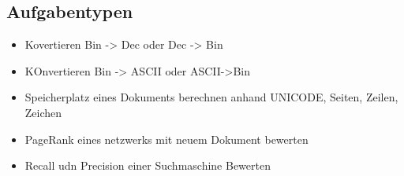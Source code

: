 \subsection{Aufgabentypen}
\begin{itemize}
    \item Kovertieren Bin -> Dec  oder Dec -> Bin
    \item KOnvertieren Bin -> ASCII oder ASCII->Bin
    \item Speicherplatz eines Dokuments berechnen anhand UNICODE, Seiten, Zeilen, Zeichen
    \item PageRank eines netzwerks mit neuem Dokument bewerten
    \item Recall udn Precision einer Suchmaschine Bewerten
\end{itemize}
